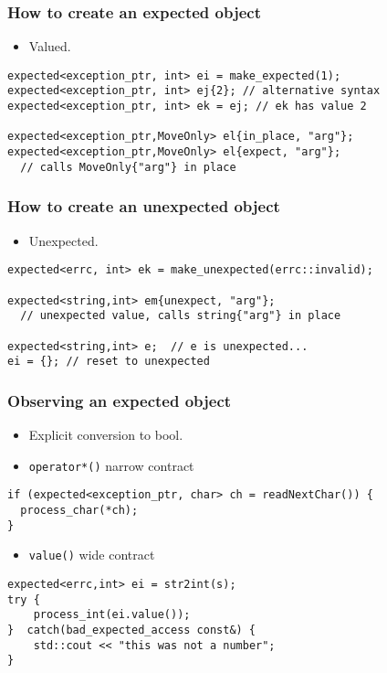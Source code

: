 \documentclass[xcolor=dvipsnames]{beamer}
\newcommand{\cpp}[1]{\lstinline{#1}}
\begin{document}
\begin{frame}[fragile]
\frametitle{How to create an expected object}

\begin{itemize}
\item Valued.
\end{itemize}

\begin{lstlisting}
expected<exception_ptr, int> ei = make_expected(1); 
expected<exception_ptr, int> ej{2}; // alternative syntax
expected<exception_ptr, int> ek = ej; // ek has value 2

expected<exception_ptr,MoveOnly> el{in_place, "arg"};        
expected<exception_ptr,MoveOnly> el{expect, "arg"};        
  // calls MoveOnly{"arg"} in place
\end{lstlisting}

\end{frame}
\begin{frame}[fragile]
\frametitle{How to create an unexpected object}

\begin{itemize}
\item Unexpected.
\end{itemize}

\begin{lstlisting}
expected<errc, int> ek = make_unexpected(errc::invalid);

expected<string,int> em{unexpect, "arg"};        
  // unexpected value, calls string{"arg"} in place

expected<string,int> e;  // e is unexpected...
ei = {}; // reset to unexpected
\end{lstlisting}

\end{frame}

\begin{frame}[fragile]
\frametitle{Observing an expected object}

\begin{itemize}
\item Explicit conversion to bool.
\item \cpp{operator*()} narrow contract
\end{itemize}

\begin{lstlisting}
if (expected<exception_ptr, char> ch = readNextChar()) {
  process_char(*ch);
}
\end{lstlisting}

\begin{itemize}
\item \cpp{value()} wide contract
\end{itemize}

\begin{lstlisting}
expected<errc,int> ei = str2int(s);
try {
    process_int(ei.value());
}  catch(bad_expected_access const&) {
    std::cout << "this was not a number";
}
\end{lstlisting}

\end{frame}
\end{document}
